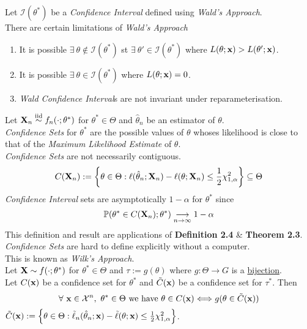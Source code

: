 \documentclass[11pt,a4paper]{article}
\begin{document}
Let $\mathcal{I}(\theta^*)$ be a \textit{Confidence Interval} defined using \textit{Wald's Approach}.\\
There are certain limitations of \textit{Wald's Approach}
\begin{enumerate}
	\item It is possible $\exists\ \theta\not\in\mathcal{I}(\theta^*)$ st $\exists\ \theta'\in\mathcal{I}(\theta^*)$ where $L(\theta;\textbf{x})>L(\theta';\textbf{x})$.
	\item It is possible $\exists\ \theta\in\mathcal{I}(\theta^*)$ where $L(\theta;\textbf{x})=0$.
	\item \textit{Wald Confidence Interval}s are not invariant under reparameterisation.
\end{enumerate}

Let $\textbf{X}_n\overset{\text{iid}}{\sim} f_n(\cdot;\theta^*)$ for $\theta^*\in\Theta$ and $\hat\theta_n$ be an estimator of $\theta$.\\
\textit{Confidence Sets} for $\theta^*$ are the possible values of $\theta$ whoses likelihood is close to that of the \textit{Maximum Likelihood Estimate} of $\theta$.\\
\textit{Confidence Sets} are not necessarily contiguous.
$$C(\textbf{X}_n):=\left\{\theta\in\Theta:\ell(\hat\theta_n;\textbf{X}_n)-\ell(\theta;\textbf{X}_n)\leq\frac{1}{2}\chi^2_{1,\alpha}\right\}\subseteq\Theta$$
\textit{Confidence Interval} sets are asymptotically $1-\alpha$ for $\theta^*$ since
$$\mathbb{P}(\theta^*\in C(\textbf{X}_n);\theta^*)\underset{n\to\infty}{\longrightarrow}1-\alpha$$
\nb This definition and result are applications of \textbf{Definition 2.4} \& \textbf{Theorem 2.3}.\\
\nb \textit{Confidence Sets} are hard to define explicitly without a computer.\\
\nb This is known as \textit{Wilk's Approach}.\\

Let $\textbf{X}\sim f(\cdot;\theta^*)$ for $\theta^*\in\Theta$ and $\tau:=g(\theta)$  where $g:\Theta\to G$ is a \underline{bijection}.\\
Let $C(\textbf{x})$ be a confidence set for $\theta^*$ and $\tilde{C}(\textbf{x})$ be a confidence set for $\tau^*$. Then
$$\forall\ \x\in\mathcal{X}^n,\ \theta^*\in\Theta\text{ we have }\theta\in C(\x)\Longleftrightarrow g(\theta\in\tilde{C}(\x))$$
\nb $\tilde{C}(\textbf{x}):=\left\{\theta\in\Theta:\tilde\ell_n(\hat\theta_n;\textbf{x})-\tilde\ell(\theta;\textbf{x})\leq\frac{1}{2}\chi^2_{1,\alpha}\right\}$.\\
\end{document}
